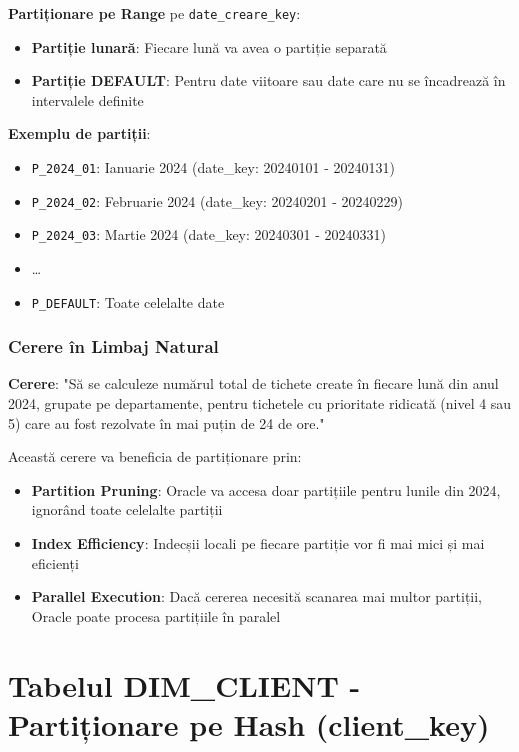 \textbf{Partiționare pe Range} pe \texttt{date\_creare\_key}:
\begin{itemize}
    \item \textbf{Partiție lunară}: Fiecare lună va avea o partiție separată
    \item \textbf{Partiție DEFAULT}: Pentru date viitoare sau date care nu se încadrează în intervalele definite
\end{itemize}

\textbf{Exemplu de partiții}:
\begin{itemize}
    \item \texttt{P\_2024\_01}: Ianuarie 2024 (date\_key: 20240101 - 20240131)
    \item \texttt{P\_2024\_02}: Februarie 2024 (date\_key: 20240201 - 20240229)
    \item \texttt{P\_2024\_03}: Martie 2024 (date\_key: 20240301 - 20240331)
    \item \ldots
    \item \texttt{P\_DEFAULT}: Toate celelalte date
\end{itemize}

\subsubsection{Cerere în Limbaj Natural}

\textbf{Cerere}: "Să se calculeze numărul total de tichete create în fiecare lună din anul 2024, grupate pe departamente, pentru tichetele cu prioritate ridicată (nivel 4 sau 5) care au fost rezolvate în mai puțin de 24 de ore."

Această cerere va beneficia de partiționare prin:
\begin{itemize}
    \item \textbf{Partition Pruning}: Oracle va accesa doar partițiile pentru lunile din 2024, ignorând toate celelalte partiții
    \item \textbf{Index Efficiency}: Indecșii locali pe fiecare partiție vor fi mai mici și mai eficienți
    \item \textbf{Parallel Execution}: Dacă cererea necesită scanarea mai multor partiții, Oracle poate procesa partițiile în paralel
\end{itemize}

\section{Tabelul DIM\_CLIENT - Partiționare pe Hash (client\_key)}

